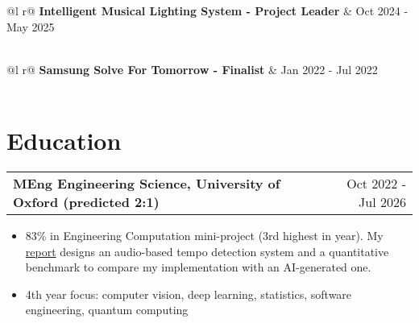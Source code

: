 \documentclass[a4paper,10pt]{article}
\makeatletter
\newenvironment{joblong}[2]
    {
    \begin{tabularx}{\linewidth}{@{}l X r@{}}
    \textbf{#1} & \hfill &  #2 \\[2pt]
    \end{tabularx}
    \begin{minipage}[t]{\linewidth}
    \begin{itemize}[nosep,after=\strut, leftmargin=1em, itemsep=1pt,label=--]
    }
    {
    \end{itemize}
    \end{minipage}    
    }
\makeatother
\begin{document}
\vspace{1pt}

\begin{tabularx}{\linewidth}{ @{}l r@{} }
\textbf{Intelligent Musical Lighting System - Project Leader} & \hfill Oct 2024 - May 2025 \\[2pt]
  \\
\end{tabularx}

\vspace{1pt}

\begin{tabularx}{\linewidth}{ @{}l r@{} }
\textbf{Samsung Solve For Tomorrow - Finalist} & \hfill Jan 2022 - Jul 2022 \\[2pt]
  \\
\end{tabularx}

\vspace{12pt}

\section{Education}

\begin{joblong}{MEng Engineering Science, University of Oxford (predicted 2:1)}{Oct 2022 - Jul 2026}
\item 83\% in Engineering Computation mini-project (3rd highest in year). My \href{https://1drv.ms/w/c/2231ec07d9c13e7f/EbBw1_GjsddKisXCrGTLfm8BNU2B3_Np0jlqxh2wpgtM_w}{report} designs an audio-based tempo detection system and a quantitative benchmark to compare my implementation with an AI-generated one.
\item 4th year focus: computer vision, deep learning, statistics, software engineering, quantum computing
\end{joblong}
\end{document}
